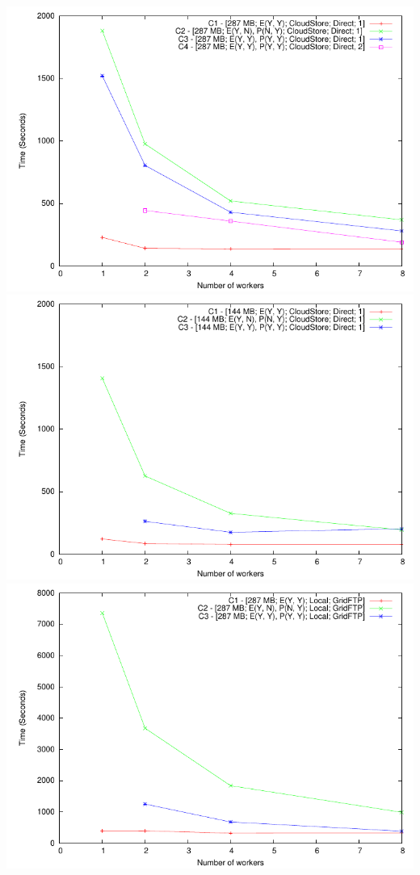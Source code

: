 \documentclass{rspublic}
\begin{document}
\includegraphics{data/graphs/CloudStoreFigure}
\includegraphics{data/graphs/CloudStoreNoComputeSmallerDataSet}
\includegraphics{data/graphs/ConventionalFigure}
\end{document}

